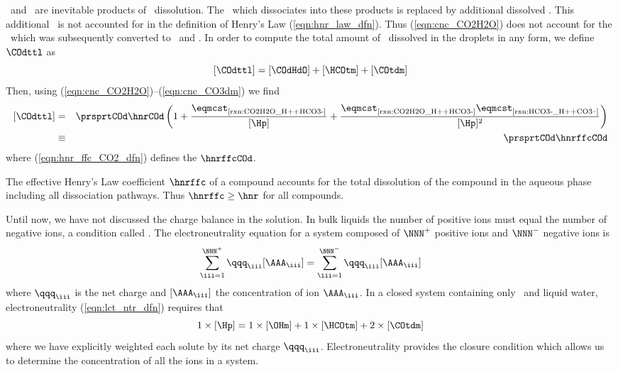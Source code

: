 \documentclass[12pt,twoside]{book}
\begin{document}
\HCOtm\ and \COtdm\ are inevitable products of \COd\ dissolution.
The \COdHdO\ which dissociates into these products is replaced by
additional dissolved \COd.
This additional \COd\ is not accounted for in the definition of
Henry's Law (\ref{eqn:hnr_law_dfn}).
Thus (\ref{eqn:cnc_CO2H2O}) does not account for the \COd\ which was  
subsequently converted to \HCOtm\ and \COtdm.
In order to compute the total amount of \COd\ dissolved in the
droplets in any form, we define $\COdttl$ as 
\begin{equation}
[\COdttl] = [\COdHdO] + [\HCOtm] + [\COtdm]
\label{eqn:CO2_ttl_dfn}
\end{equation}
Then, using (\ref{eqn:cnc_CO2H2O})--(\ref{eqn:cnc_CO3dm}) we find
\begin{eqnarray}
\label{eqn:CO2_ttl_dfn_2}
[\COdttl] & = & \prsprtCOd \hnrCOd \left(
1 + \frac{\eqmcst_{\mbox{\scriptsize \ref{rxn:CO2H2O_H++HCO3-}}}}{[\Hp] } + 
\frac{\eqmcst_{\mbox{\scriptsize \ref{rxn:CO2H2O_H++HCO3-}}} \eqmcst_{\mbox{\scriptsize \ref{rxn:HCO3-_H++CO3--}}}}{[\Hp]^{2} }
\right)
\\ %
\label{eqn:hnr_ffc_CO2_dfn}
& \equiv & \prsprtCOd \hnrffcCOd
\end{eqnarray}
where (\ref{eqn:hnr_ffc_CO2_dfn}) defines the  $\hnrffcCOd$.

The effective Henry's Law coefficient $\hnrffc$ of a compound accounts
for the total dissolution of the compound in the aqueous phase
including all dissociation pathways. 
Thus $\hnrffc \ge \hnr$ for all compounds.

Until now, we have not discussed the charge balance in the solution.
In bulk liquids the number of positive ions must equal the number of
negative ions, a condition called .
The electroneutrality equation for a system composed of $\NNN^+$
positive ions and $\NNN^-$ negative ions is 
\begin{equation}
\sum_{\iii = 1}^{\NNN^+} \qqq_{\iii} [\AAA_{\iii}] = 
\sum_{\iii = 1}^{\NNN^-} \qqq_{\iii} [\AAA_{\iii}]  
\label{eqn:lct_ntr_dfn}
\end{equation}
where $\qqq_{\iii}$ is the net charge and $[\AAA_{\iii}]$ the concentration
of ion $\AAA_{\iii}$. 
In a closed system containing only \COd\ and liquid water,
electroneutrality (\ref{eqn:lct_ntr_dfn}) requires that
\begin{equation}
1 \times [\Hp] = 1 \times [\OHm] + 1 \times [\HCOtm] + 2 \times [\COtdm]
\label{eqn:lct_ntr_CO2_H2O}
\end{equation}
where we have explicitly weighted each solute by its net charge
$\qqq_{\iii}$. 
Electroneutrality provides the closure condition which allows us to 
determine the concentration of all the ions in a system.
\end{document}
